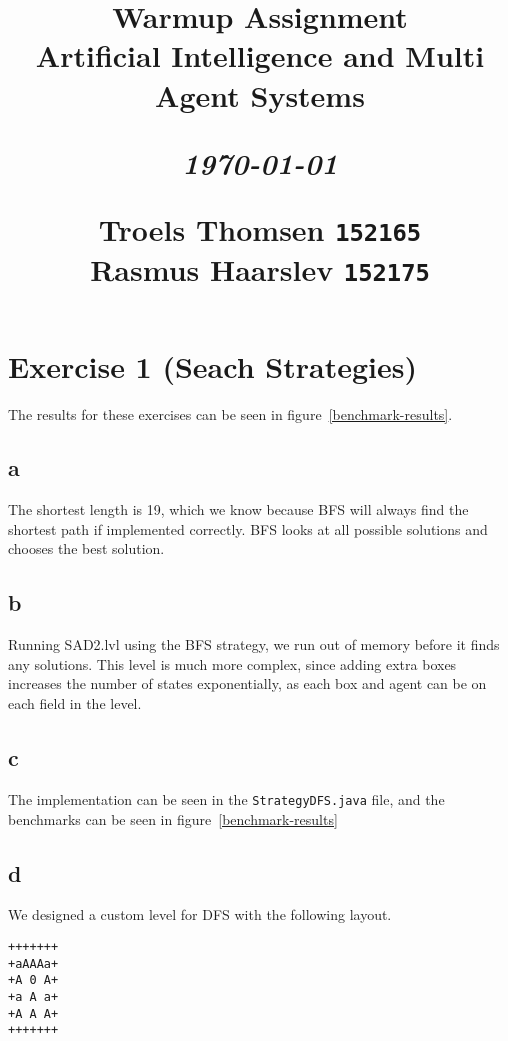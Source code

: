 \documentclass[12pt]{article}
\title{
  \vspace{4cm}
  \begin{flushleft}
  \Large{\textbf{Warmup Assignment}} \\
  \large{Artificial Intelligence and Multi Agent Systems}
  \end{flushleft}
  \vspace{0cm}
  \begin{flushleft}
  \small
  \textit{\today}
  \end{flushleft}
  \vspace{12cm}
  \begin{flushleft}
  \small
  Troels Thomsen \texttt{152165} \\
  Rasmus Haarslev \texttt{152175} \\
  \end{flushleft}
}
\date{
}
\begin{document}
\clearpage
{}
\thispagestyle{empty}
\maketitle

\newpage

\section{Exercise 1 (Seach Strategies)}

The results for these exercises can be seen in figure~\ref{benchmark-results}.


\subsection{a}
\label{sub:a}

The shortest length is 19, which we know because BFS will always find the shortest path if implemented correctly. BFS looks at all possible solutions and chooses the best solution.


\subsection{b}
\label{sub:b}

Running SAD2.lvl using the BFS strategy, we run out of memory before it finds any solutions.
This level is much more complex, since adding extra boxes increases the number of states exponentially, as each box and agent can be on each field in the level.


\subsection{c}
\label{sub:c}

The implementation can be seen in the \texttt{StrategyDFS.java} file, and the benchmarks can be seen in figure~\ref{benchmark-results}


\subsection{d}
\label{sub:d}

We designed a custom level for DFS with the following layout.

\begin{verbatim}
+++++++
+aAAAa+
+A 0 A+
+a A a+
+A A A+
+++++++
\end{verbatim}
\end{document}
